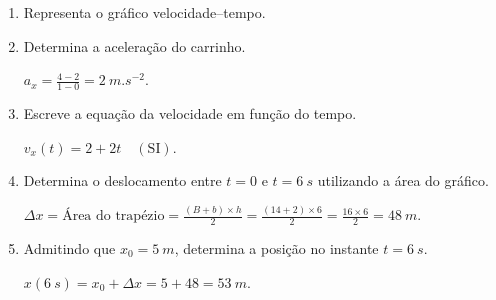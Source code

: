 \documentclass[11pt,a4paper]{article}
\begin{document}
	\begin{enumerate}[label=\textbf{\arabic*.},resume]
		
		\item Representa o gráfico velocidade--tempo.
		
		\begin{solucao}
			\begin{center}
			\end{center}
		\end{solucao}
		
		\item Determina a aceleração do carrinho.
		
		\begin{solucao}
			$a_x = \frac{4 - 2}{1 - 0} = \SI{2}{m.s^{-2}}$.
		\end{solucao}
		
		\item Escreve a equação da velocidade em função do tempo.
		
		\begin{solucao}
			$v_x(t) = 2 + 2t \quad (\text{SI})$.
		\end{solucao}
		
		\item Determina o deslocamento entre $t=0$ e $t=\SI{6}{s}$ utilizando a área
		do gráfico.
		
		\begin{solucao}
			$\Delta x = \text{Área do trapézio} = \frac{(B + b) \times h}{2} = \frac{(14 + 2) \times 6}{2} = \frac{16 \times 6}{2} = \SI{48}{m}$.
		\end{solucao}
		
		\item Admitindo que $x_0=\SI{5}{m}$, determina a posição no instante
		$t=\SI{6}{s}$.
		
		\begin{solucao}
			$x(\SI{6}{s}) = x_0 + \Delta x = 5 + 48 = \SI{53}{m}$.
		\end{solucao}
		
	\end{enumerate}
	
\end{document}
